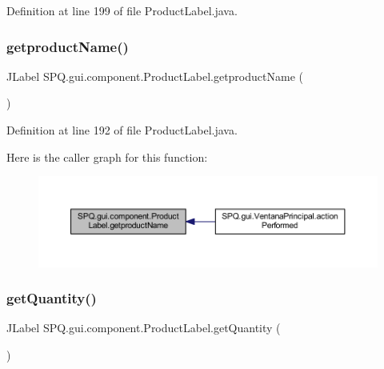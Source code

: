 Definition at line 199 of file Product\+Label.\+java.

\mbox{\label{class_s_p_q_1_1gui_1_1component_1_1_product_label_a614cfb4f7e9b89e21e7225ac7c93ef2c}} 
\subsubsection{\texorpdfstring{getproduct\+Name()}{getproductName()}}
{\footnotesize\ttfamily J\+Label S\+P\+Q.\+gui.\+component.\+Product\+Label.\+getproduct\+Name (\begin{DoxyParamCaption}{ }\end{DoxyParamCaption})}



Definition at line 192 of file Product\+Label.\+java.

Here is the caller graph for this function\+:\nopagebreak
\begin{figure}[H]
\begin{center}
\leavevmode
\includegraphics[width=350pt]{class_s_p_q_1_1gui_1_1component_1_1_product_label_a614cfb4f7e9b89e21e7225ac7c93ef2c_icgraph}
\end{center}
\end{figure}
\mbox{\label{class_s_p_q_1_1gui_1_1component_1_1_product_label_adcfdea4cb072291bea24728bf75aac10}} 
\subsubsection{\texorpdfstring{get\+Quantity()}{getQuantity()}}
{\footnotesize\ttfamily J\+Label S\+P\+Q.\+gui.\+component.\+Product\+Label.\+get\+Quantity (\begin{DoxyParamCaption}{ }\end{DoxyParamCaption})}




